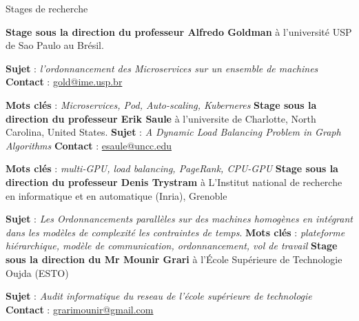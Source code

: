 \begin{rubric}{Stages de recherche}



     \textbf{Stage sous la direction du professeur Alfredo Goldman} à l'université USP de Sao Paulo au Brésil.
	\par \textbf{Sujet} : \emph{l'ordonnancement des Microservices sur un ensemble de machines}
	\textbf{Contact} : \href{mailto:gold@ime.usp.br}{gold@ime.usp.br}
	\par \textbf{Mots clés} : \emph{Microservices, Pod, Auto-scaling, Kuberneres}
%
	\textbf{Stage sous la direction du professeur Erik Saule} à l’universite de Charlotte, North Carolina, United States.
	\textbf{Sujet} : \emph{A Dynamic Load Balancing Problem in Graph Algorithms}
	\textbf{Contact} : \href{mailto:esaule@uncc.edu}{esaule@uncc.edu}
	\par \textbf{Mots clés} : \emph{multi-GPU, load balancing, PageRank, CPU-GPU}
%
%
	\textbf{Stage sous la direction du professeur Denis Trystram} à L'Institut national de recherche en informatique et en automatique (Inria), Grenoble
	\par	\textbf{Sujet} : \emph{Les Ordonnancements parallèles sur des machines homogènes en intégrant dans les modèles de complexité les contraintes de temps}.
	\textbf{Mots clés} : \emph{plateforme hiérarchique, modèle de communication, ordonnancement, vol de travail}
%
%
	\textbf{Stage sous la direction du Mr Mounir Grari} à l’École Supérieure de Technologie Oujda (ESTO)
	\par	\textbf{Sujet} : \emph{Audit informatique du reseau de l'école supérieure de technologie}
	\textbf{Contact} :  \href{mailto:grarimounir@gmail.com}{grarimounir@gmail.com}
\end{rubric}
